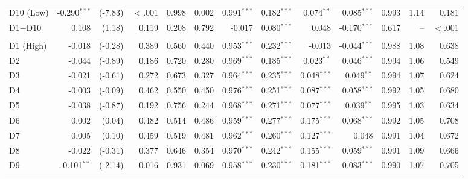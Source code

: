 \begin{table}[!htbp]
{\begin{tabular}{lrrrrrrrrrrrr}
\hspace{1em}D10 (Low) & -0.290$^{***}$ & (-7.83) & $<$.001 & 0.998 & 0.002 & 0.991$^{***}$ & 0.182$^{***}$ & 0.074$^{**}$ & 0.085$^{***}$ & 0.993 & 1.14 & 0.181\\
\hspace{1em}D1$-$D10 & 0.108 & (1.18) & 0.119 & 0.208 & 0.792 & -0.017 & 0.080$^{***}$ & 0.048 & -0.170$^{***}$ & 0.617 & -- & $<$.001\\
\addlinespace[0.3em]
\hline
\multicolumn{13}{l}{\textit{Panel E: P3 (from Sep 2010), cohorts 5, 6, 7}}\\
\hspace{1em}D1 (High) & -0.018 & (-0.28) & 0.389 & 0.560 & 0.440 & 0.953$^{***}$ & 0.232$^{***}$ & -0.013 & -0.044$^{***}$ & 0.988 & 1.08 & 0.638\\
\hspace{1em}D2 & -0.044 & (-0.89) & 0.186 & 0.720 & 0.280 & 0.969$^{***}$ & 0.185$^{***}$ & 0.023$^{**}$ & 0.046$^{***}$ & 0.994 & 1.06 & 0.549\\
\hspace{1em}D3 & -0.021 & (-0.61) & 0.272 & 0.673 & 0.327 & 0.964$^{***}$ & 0.235$^{***}$ & 0.048$^{***}$ & 0.049$^{**}$ & 0.994 & 1.07 & 0.624\\
\hspace{1em}D4 & -0.003 & (-0.09) & 0.462 & 0.550 & 0.450 & 0.976$^{***}$ & 0.251$^{***}$ & 0.087$^{***}$ & 0.058$^{***}$ & 0.992 & 1.05 & 0.680\\
\hspace{1em}D5 & -0.038 & (-0.87) & 0.192 & 0.756 & 0.244 & 0.968$^{***}$ & 0.271$^{***}$ & 0.077$^{***}$ & 0.039$^{**}$ & 0.995 & 1.03 & 0.634\\
\hspace{1em}D6 & 0.002 & (0.04) & 0.482 & 0.514 & 0.486 & 0.959$^{***}$ & 0.277$^{***}$ & 0.175$^{***}$ & 0.068$^{***}$ & 0.992 & 1.05 & 0.708\\
\hspace{1em}D7 & 0.005 & (0.10) & 0.459 & 0.519 & 0.481 & 0.962$^{***}$ & 0.260$^{***}$ & 0.127$^{***}$ & 0.048 & 0.991 & 1.04 & 0.672\\
\hspace{1em}D8 & -0.022 & (-0.31) & 0.377 & 0.646 & 0.354 & 0.970$^{***}$ & 0.242$^{***}$ & 0.155$^{***}$ & 0.059$^{***}$ & 0.991 & 1.09 & 0.666\\
\hspace{1em}D9 & -0.101$^{**}$ & (-2.14) & 0.016 & 0.931 & 0.069 & 0.958$^{***}$ & 0.230$^{***}$ & 0.181$^{***}$ & 0.083$^{***}$ & 0.990 & 1.07 & 0.705\\

\end{tabular}}
\end{table}
